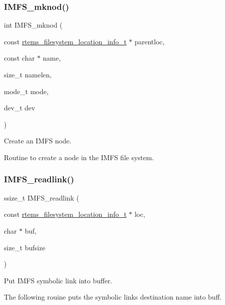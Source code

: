 \subsubsection{\texorpdfstring{IMFS\_mknod()}{IMFS\_mknod()}}
{\footnotesize\ttfamily int I\+M\+F\+S\+\_\+mknod (\begin{DoxyParamCaption}\item[{const \mbox{\hyperlink{group__LibIO_ga3252b3d31ee3c49ffff0b7604a676864}{rtems\+\_\+filesystem\+\_\+location\+\_\+info\+\_\+t}} $\ast$}]{parentloc,  }\item[{const char $\ast$}]{name,  }\item[{size\+\_\+t}]{namelen,  }\item[{mode\+\_\+t}]{mode,  }\item[{dev\+\_\+t}]{dev }\end{DoxyParamCaption})}



Create an I\+M\+FS node. 

Routine to create a node in the I\+M\+FS file system. \mbox{\label{group__IMFS_gaf65f51402a7c595b2308e1fbc0f1c9f0}} 
\subsubsection{\texorpdfstring{IMFS\_readlink()}{IMFS\_readlink()}}
{\footnotesize\ttfamily ssize\+\_\+t I\+M\+F\+S\+\_\+readlink (\begin{DoxyParamCaption}\item[{const \mbox{\hyperlink{group__LibIO_ga3252b3d31ee3c49ffff0b7604a676864}{rtems\+\_\+filesystem\+\_\+location\+\_\+info\+\_\+t}} $\ast$}]{loc,  }\item[{char $\ast$}]{buf,  }\item[{size\+\_\+t}]{bufsize }\end{DoxyParamCaption})}



Put I\+M\+FS symbolic link into buffer. 

The following rouine puts the symbolic links destination name into buff. \mbox{\label{group__IMFS_ga36af606732f5f7b5695c9608816f5a39}} 
